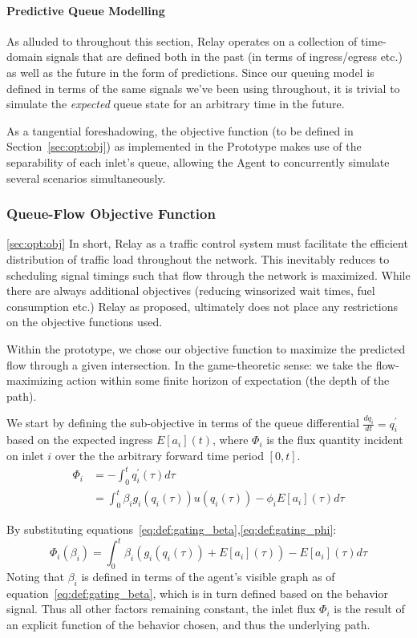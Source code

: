 \documentclass{report}
\begin{document}
\paragraph{Predictive Queue Modelling}
As alluded to throughout this section, Relay operates on a collection of time-domain signals that are defined both in the past (in terms of ingress/egress etc.) as well as the future in the form of predictions.
Since our queuing model is defined in terms of the same signals we've been using throughout, it is trivial to simulate the \emph{expected} queue state for an arbitrary time in the future.

As a tangential foreshadowing, the objective function (to be defined in Section~\ref{sec:opt:obj}) as implemented in the Prototype makes use of the separability of each inlet's queue, allowing the Agent to concurrently simulate several scenarios simultaneously.

\subsubsection{Queue-Flow Objective Function}
\ref{sec:opt:obj}
In short, Relay as a traffic control system must facilitate the efficient distribution of traffic load throughout the network.
This inevitably reduces to scheduling signal timings such that flow through the network is maximized.
While there are always additional objectives (reducing winsorized wait times, fuel consumption etc.) Relay as proposed, ultimately does not place any restrictions on the objective functions used.

Within the prototype, we chose our objective function to maximize the predicted flow through a given intersection.
In the game-theoretic sense: we take the flow-maximizing action within some finite horizon of expectation (the depth of the path).

We start by defining the sub-objective in terms of the queue differential $\frac{dq_i}{dt} = q_i^\prime$ based on the expected ingress $E[a_i](t)$, where $\Phi_i$ is the flux quantity incident on inlet $i$ over the the arbitrary forward time period $[0, t]$.
\begin{align}\label{eq:def:sub_objective1}
	\Phi_i &= - \int_0^t q^\prime_i(\tau) d\tau\\
	&= \int_0^t \beta_i g_i(q_i(\tau)) u(q_i(\tau)) - \phi_i E\left[a_i\right](\tau) d\tau
\end{align}

By substituting equations~\eqref{eq:def:gating_beta},\eqref{eq:def:gating_phi}:
\begin{equation}\label{eq:def:sub_objective2}
	\Phi_i(\beta_i) = \int_0^t \beta_i \left(g_i(q_i(\tau)) + E[a_i](\tau)\right) - E[a_i](\tau) d\tau
\end{equation}
Noting that $\beta_i$ is defined in terms of the agent's visible graph as of equation~\eqref{eq:def:gating_beta}, which is in turn defined based on the behavior signal.
Thus all other factors remaining constant, the inlet flux $\Phi_i$ is the result of an explicit function of the behavior chosen, and thus the underlying path.
\end{document}
